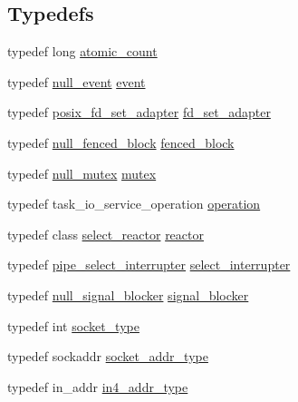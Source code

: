 \subsection*{Typedefs}
\begin{DoxyCompactItemize}
\item 
typedef long \hyperlink{namespaceasio_1_1detail_a75f94bf579dec2f59a0c4af6c4c3606e}{atomic\+\_\+count}
\item 
typedef \hyperlink{classasio_1_1detail_1_1null__event}{null\+\_\+event} \hyperlink{namespaceasio_1_1detail_a83969c12552b8b4db0c39a9efd1e0e25}{event}
\item 
typedef \hyperlink{classasio_1_1detail_1_1posix__fd__set__adapter}{posix\+\_\+fd\+\_\+set\+\_\+adapter} \hyperlink{namespaceasio_1_1detail_a349ef452bc2dc3865e797f922a468449}{fd\+\_\+set\+\_\+adapter}
\item 
typedef \hyperlink{classasio_1_1detail_1_1null__fenced__block}{null\+\_\+fenced\+\_\+block} \hyperlink{namespaceasio_1_1detail_ab15bb9aa4ee801fe8fdc4c687e4b2653}{fenced\+\_\+block}
\item 
typedef \hyperlink{classasio_1_1detail_1_1null__mutex}{null\+\_\+mutex} \hyperlink{namespaceasio_1_1detail_a5740d9cd098ece66556d1e8644cf3060}{mutex}
\item 
typedef task\+\_\+io\+\_\+service\+\_\+operation \hyperlink{namespaceasio_1_1detail_a338968609bec20e37145309f8f9ec936}{operation}
\item 
typedef class \hyperlink{classasio_1_1detail_1_1select__reactor}{select\+\_\+reactor} \hyperlink{namespaceasio_1_1detail_a84c582743740f1d6b19111c88e2922bd}{reactor}
\item 
typedef \hyperlink{classasio_1_1detail_1_1pipe__select__interrupter}{pipe\+\_\+select\+\_\+interrupter} \hyperlink{namespaceasio_1_1detail_af134b6407cc041a03d1c0b8821ae00c1}{select\+\_\+interrupter}
\item 
typedef \hyperlink{classasio_1_1detail_1_1null__signal__blocker}{null\+\_\+signal\+\_\+blocker} \hyperlink{namespaceasio_1_1detail_a4ba936a7407061df651a0da023c9286c}{signal\+\_\+blocker}
\item 
typedef int \hyperlink{namespaceasio_1_1detail_a6798c771dd84b79798b1a08150706ea9}{socket\+\_\+type}
\item 
typedef sockaddr \hyperlink{namespaceasio_1_1detail_a40a7b0385a38f87815ffbb8df5e34d05}{socket\+\_\+addr\+\_\+type}
\item 
typedef in\+\_\+addr \hyperlink{namespaceasio_1_1detail_a8e45a79a5ed322972acbf5c93782cef8}{in4\+\_\+addr\+\_\+type}

\end{DoxyCompactItemize}
